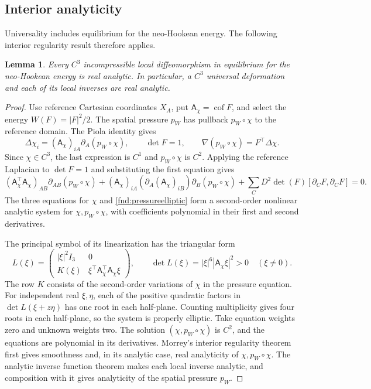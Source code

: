 \documentclass[11pt,a4paper]{article}
\numberwithin{equation}{section}
\theoremstyle{plain}
\newtheorem{lemma}[theorem]{Lemma}
\theoremstyle{definition}
\theoremstyle{remark}
\begin{document}
\subsection{Interior analyticity}
Universality includes equilibrium for the neo-Hookean energy. The
following interior regularity result therefore applies.

\begin{lemma}\label{fnd:analyticity}
Every $C^3$ incompressible local diffeomorphism in equilibrium for the
neo-Hookean energy is real analytic. In particular, a $C^3$ universal
deformation and each of its local inverses are real analytic.
\end{lemma}
\begin{proof}
Use reference Cartesian coordinates $X_A$, put $\mathsf A_\chi=\operatorname{cof}F$, and select the energy $W(F)=|F|^2/2$. The spatial pressure $p_W$ has pullback $p_W\circ\chi$ to the reference domain. The Piola identity gives
\begin{equation}\label{fnd:neo}
\Delta\chi_i=(\mathsf A_\chi)_{iA}\partial_A(p_W\circ\chi),\qquad \det F=1,\qquad
\nabla(p_W\circ\chi)=F^{\top}\Delta\chi.
\end{equation}
Since $\chi\in C^3$, the last expression is $C^1$ and $p_W\circ\chi$ is $C^2$. Applying the reference Laplacian to $\det F=1$ and substituting the first equation gives
\begin{equation}\label{fnd:pressureelliptic}
(\mathsf A_\chi^{\top}\mathsf A_\chi)_{AB}\partial_{AB}(p_W\circ\chi)
+(\mathsf A_\chi)_{iA}(\partial_A(\mathsf A_\chi)_{iB})\partial_B(p_W\circ\chi)
+\sum_C D^2\det(F)[\partial_CF,\partial_CF]=0.
\end{equation}
The three equations for $\chi$ and \eqref{fnd:pressureelliptic} form a second-order nonlinear analytic system for $\chi,p_W\circ\chi$, with coefficients polynomial in their first and second derivatives.

The principal symbol of its linearization has the triangular form
\[
L(\xi)=\begin{pmatrix}|\xi|^2I_3&0\\ K(\xi)&\xi^{\top}\mathsf A_\chi^{\top}\mathsf A_\chi\xi\end{pmatrix},
\qquad \det L(\xi)=|\xi|^6|\mathsf A_\chi\xi|^2>0\quad(\xi\ne0).
\]
The row $K$ consists of the second-order variations of $\chi$ in the pressure equation. For independent real $\xi,\eta$, each of the positive quadratic factors in $\det L(\xi+z\eta)$ has one root in each half-plane. Counting multiplicity gives four roots in each half-plane, so the system is properly elliptic. Take equation weights zero and unknown weights two. The solution $(\chi,p_W\circ\chi)$ is $C^2$, and the equations are polynomial in its derivatives. Morrey's interior regularity theorem \cite[Theorem~6.8.1, pp.~277--278]{Morrey1966} first gives smoothness and, in its analytic case, real analyticity of $\chi,p_W\circ\chi$. The analytic inverse function theorem makes each local inverse analytic, and composition with it gives analyticity of the spatial pressure $p_W$.
\end{proof}
\end{document}
